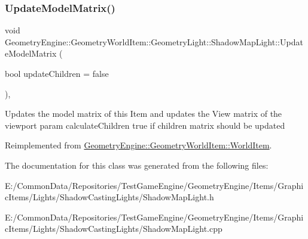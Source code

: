 \subsubsection{\texorpdfstring{UpdateModelMatrix()}{UpdateModelMatrix()}}
{\footnotesize\ttfamily void Geometry\+Engine\+::\+Geometry\+World\+Item\+::\+Geometry\+Light\+::\+Shadow\+Map\+Light\+::\+Update\+Model\+Matrix (\begin{DoxyParamCaption}\item[{bool}]{update\+Children = {\ttfamily false} }\end{DoxyParamCaption})\hspace{0.3cm}{\ttfamily [override]}, {\ttfamily [virtual]}}

Updates the model matrix of this Item and updates the View matrix of the viewport param calculate\+Children true if children matrix should be updated 

Reimplemented from \mbox{\hyperlink{class_geometry_engine_1_1_geometry_world_item_1_1_world_item_a86effd24c41c87be8925ee3addd8c33d}{Geometry\+Engine\+::\+Geometry\+World\+Item\+::\+World\+Item}}.



The documentation for this class was generated from the following files\+:\begin{DoxyCompactItemize}
\item 
E\+:/\+Common\+Data/\+Repositories/\+Test\+Game\+Engine/\+Geometry\+Engine/\+Items/\+Graphic\+Items/\+Lights/\+Shadow\+Casting\+Lights/Shadow\+Map\+Light.\+h\item 
E\+:/\+Common\+Data/\+Repositories/\+Test\+Game\+Engine/\+Geometry\+Engine/\+Items/\+Graphic\+Items/\+Lights/\+Shadow\+Casting\+Lights/Shadow\+Map\+Light.\+cpp\end{DoxyCompactItemize}
